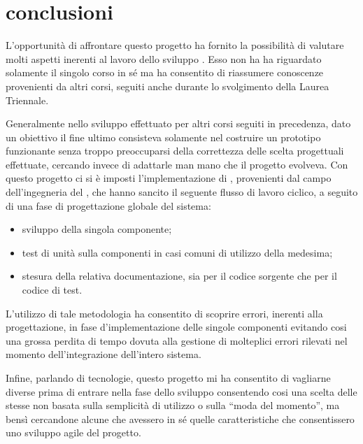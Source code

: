 %
\chapter*{conclusioni}
\label{conclusioni}
L'opportunità di affrontare questo progetto ha fornito la possibilità di valutare molti aspetti inerenti al lavoro dello sviluppo . Esso non ha ha riguardato solamente il singolo corso in sé ma ha consentito di riassumere conoscenze provenienti da altri corsi, seguiti anche durante lo svolgimento della Laurea Triennale.

Generalmente nello sviluppo  effettuato per altri corsi seguiti in precedenza, dato un obiettivo il fine ultimo consisteva solamente nel costruire un prototipo funzionante senza troppo preoccuparsi della correttezza delle scelta progettuali effettuate, cercando invece di adattarle man mano che il progetto evolveva. Con questo progetto ci si è imposti l'implementazione di , provenienti dal campo dell'ingegneria del , che hanno sancito il seguente flusso di lavoro ciclico, a seguito di una fase di progettazione globale del sistema:

\begin{itemize}
\item{sviluppo della singola componente;}
\item{test di unità sulla componenti in casi comuni di utilizzo della medesima;}
\item{stesura della relativa documentazione, sia per il codice sorgente che per il codice di test.}
\end{itemize}

L'utilizzo di tale metodologia ha consentito di scoprire errori, inerenti alla progettazione, in fase d'implementazione delle singole componenti evitando cosi una grossa perdita di tempo dovuta alla gestione di molteplici errori rilevati nel momento dell'integrazione dell'intero sistema.

Infine, parlando di tecnologie, questo progetto mi ha consentito di vagliarne diverse prima di entrare nella fase dello sviluppo consentendo cosi una scelta delle stesse non basata sulla semplicità di utilizzo o sulla ``moda del momento'', ma bensì cercandone alcune che avessero in sé quelle caratteristiche che consentissero uno sviluppo agile del progetto.